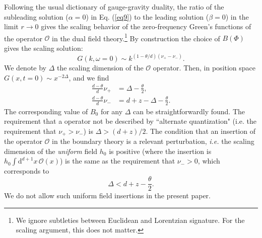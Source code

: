 \documentclass[10pt, oneside]{book}
\begin{document}
\begin{doublespace}
Following the usual dictionary of gauge-gravity duality, the ratio of the subleading solution ($\alpha=0$) in Eq. (\ref{eq9}) to the leading solution ($\beta=0$) in the limit $r \rightarrow 0$ gives the scaling behavior of the zero-frequency Green's functions 
of the operator $\mathcal{O}$ in the dual field theory.\footnote{We ignore subtleties between Euclidean and Lorentzian signature. For the scaling argument, this does not matter.} By construction the choice of $B(\Phi)$ gives the scaling solution: 
\begin{equation}
G(k,\omega=0) \sim k^{(1-\theta/d)(\nu_+-\nu_-)}.
\end{equation}
We denote by $\Delta$ the scaling dimension of the $\mathcal{O}$ operator. Then, 
in position space $\mbox{$G(x,t=0)$}\sim x^{-2\Delta}$, and we find
\begin{subequations}\begin{align}
\frac{d-\theta}{d}\nu_+ &= \Delta-\frac{\theta}{2}, \\
\frac{d-\theta}{d}\nu_- &= d+z-\Delta - \frac{\theta}{2}.
\end{align}\end{subequations}
The corresponding value of $B_0$ for any $\Delta$ can be straightforwardly found.   The requirement that a operator not be described by ``alternate quantization" (i.e. the requirement that $\nu_+>\nu_-$) is $\Delta > (d+z)/2$.
The condition that an insertion of the operator $\mathcal{O}$ in the boundary theory is a relevant perturbation, 
{\em i.e.\/} the scaling dimension of the {\em uniform\/} field $h_0$ is positive (where the insertion is $h_0 \int \mathrm{d}^{d+1} x \, \mathcal{O} (x)$)
is the same as the requirement that $\nu_->0$, which corresponds to 
\begin{equation}
\Delta<d+z - \frac{\theta}{2}.
\end{equation}  
We do not allow such uniform field insertions in the present paper.


\end{doublespace}
\end{document}
